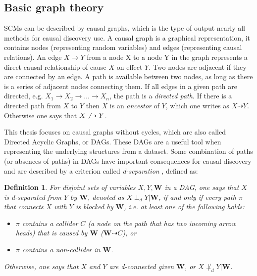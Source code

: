 \documentclass[a4paper,pdf]{article}
\newcommand{\dsep}{\perp_d}
\newcommand{\dcon}{\not \perp_d}
\newcommand\causes{\dashrightarrow}
\newcommand\notcauses{\text{${}\not\!\dashrightarrow{}$}}
\newcommand\B[1]{\textbf{#1}} %
\newtheorem{definition}{Definition}
\begin{document}
\subsection{Basic graph theory} \label{sec:basic_graph}
SCMs can be described by causal graphs, which is the type of output nearly all methods for causal discovery use. A causal graph is a graphical representation, it contains nodes (representing random variables) and edges (representing causal relations). 
An edge $X\to Y$ from a node X to a node Y in the graph represents a direct causal relationship of cause $X$ on effect $Y$. 
Two nodes are adjacent if they are connected by an edge. A path is available between two nodes, as long as there is a series of adjacent nodes connecting them. If all edges in a given path are directed, e.g. $X_1 \to X_2 \to \dots \to X_n$, the path is a \emph{directed path}.
If there is a directed path from $X$ to $Y$ then $X$ is an \emph{ancestor} of $Y$, which one writes as $X \causes Y$. Otherwise one says that $X \notcauses Y$.

This thesis focuses on causal graphs without cycles, which are also called Directed Acyclic Graphs, or DAGs. These DAGs are a useful tool when representing the underlying structures from a dataset. Some combination of paths (or absences of paths) in DAGs have important consequences for causal discovery and are described by a criterion called \emph{d-separation} \cite{Pearl2009inference,Spirtes2000}, defined as:

\begin{definition}
  For disjoint sets of variables $X,Y,\B{W}$ in a DAG, one says that $X$ is d-separated from $Y$ by $\B{W}$, denoted as $X \dsep Y | \B{W}$, if and only if every path $\pi$ that connects $X$ with $Y$ is \emph{blocked} by $\B{W}$, i.e. at least one of the following holds:
  \begin{itemize}
    \item $\pi$ contains a collider $C$ (a node on the path that has two incoming arrow heads) that is caused by $\B{W}$ ($\B{W} \causes C$), or
    \item $\pi$ contains a non-collider in $\B{W}$.
  \end{itemize}
  Otherwise, one says that $X$ and $Y$ are d-connected given $\B{W}$, or $X \dcon Y | \B{W}$.
\end{definition}
  
\end{document}
